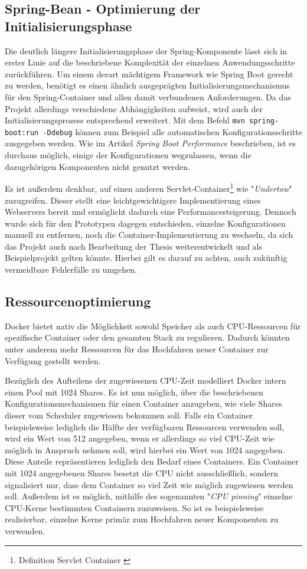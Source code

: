 \subsection{Spring-Bean - Optimierung der Initialisierungsphase}
\label{ss:spring-perf}

Die deutlich längere Initialisierungsphase der Spring-Komponente lässt sich in erster Linie auf die beschriebene Komplexität der einzelnen Anwendungsschritte zurückführen. Um einem derart mächtigem Framework wie Spring Boot gerecht zu werden, benötigt es einen ähnlich ausgeprägten Initialisierungsmechanismus für den Spring-Container und allen damit verbundenen Anforderungen. Da das Projekt allerdings verschiedene Abhängigkeiten aufweist, wird auch der Initialisierungsprozess entsprechend erweitert. Mit dem Befehl \verb+mvn spring-boot:run -Ddebug+ können zum Beispiel alle automatischen Konfigurationsschritte ausgegeben werden. Wie im Artikel \emph{Spring Boot Performance}\cite{spring-perf} beschrieben, ist es durchaus möglich, einige der Konfigurationen wegzulassen, wenn die dazugehörigen Komponenten nicht genutzt werden. 

Es ist außerdem denkbar, auf einen anderen Servlet-Container\footnote{Definition Servlet Container \cite{servlet-container-def}} wie "\emph{Undertow}" zuzugreifen. Dieser stellt eine leichtgewichtigere Implementierung eines Webservers bereit und ermöglicht dadurch eine Performancesteigerung. Dennoch wurde sich für den Prototypen dagegen entschieden, einzelne Konfigurationen manuell zu entfernen, noch die Container-Implementierung zu wechseln, da sich das Projekt auch nach Bearbeitung der Thesis weiterentwickelt und als Beispielprojekt gelten könnte. Hierbei gilt es darauf zu achten, auch zukünftig vermeidbare Fehlerfälle zu umgehen.


\subsection{Ressourcenoptimierung}
\label{par:resOpt}
Docker bietet nativ die Möglichkeit sowohl Speicher als auch CPU-Ressourcen für spezifische Container oder den gesamten Stack zu regulieren. Dadurch könnten unter anderem mehr Ressourcen für das Hochfahren neuer Container zur Verfügung gestellt werden.

Bezüglich des Aufteilens der zugewiesenen CPU-Zeit modelliert Docker intern einen Pool mit 1024 Shares. Es ist nun möglich, über die beschriebenen Konfigurationsmechanismen für einen Container anzugeben, wie viele Shares dieser vom Scheduler zugewiesen bekommen soll. Falls ein Container beispielsweise lediglich die Hälfte der verfügbaren Ressourcen verwenden soll, wird ein Wert von 512 angegeben, wenn er allerdings so viel CPU-Zeit wie möglich in Anspruch nehmen soll, wird hierbei ein Wert von 1024 angegeben. Diese Anteile repräsentieren lediglich den Bedarf eines Containers. Ein Container mit 1024 angegebenen Shares besetzt die CPU nicht ausschließlich, sondern signalisiert nur, dass dem Container so viel Zeit wie möglich zugewiesen werden soll. Außerdem ist es möglich, mithilfe des sogenannten "\emph{CPU pinning}" einzelne CPU-Kerne bestimmten Containern zuzuweisen. So ist es beispielsweise realisierbar, einzelne Kerne primär zum Hochfahren neuer Komponenten zu verwenden. 

